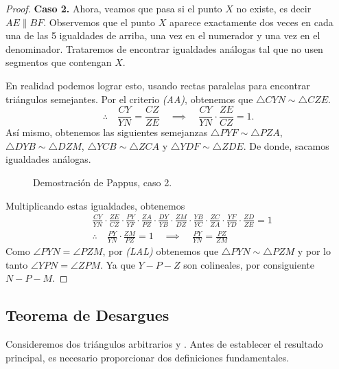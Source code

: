 \begin{proof}
    \textbf{Caso 2.}
    Ahora, veamos que pasa si el punto $X$ no existe, es decir $AE \parallel BF$.
    Observemos que el punto $X$ aparece exactamente dos veces en cada una de las 5 igualdades de arriba, una vez en el numerador y una vez en el denominador.
    Trataremos de encontrar igualdades análogas tal que no usen segmentos que contengan $X$.

    \begin{multicols}{2}
        En realidad podemos lograr esto, usando rectas paralelas para encontrar triángulos semejantes.
        Por el criterio \textit{(AA)}, obtenemos que $\triangle CYN \sim \triangle CZE$.
        \[
            \therefore  \quad \frac{CY}{YN} = \frac{CZ}{ZE} \quad \implies \quad \frac{CY}{YN} \cdot \frac{ZE}{CZ} = 1.
        \]
        Así mismo, obtenemos las siguientes semejanzas $\triangle PYF \sim \triangle PZA$, $\triangle DYB \sim \triangle DZM$, $\triangle YCB \sim \triangle ZCA$ y $\triangle YDF \sim \triangle ZDE$.
        De donde, sacamos igualdades análogas.
        \begin{figure}[H]
            \centering
            
            \caption{Demostración de Pappus, caso 2.}
        \end{figure}
    \end{multicols}

    Multiplicando estas igualdades, obtenemos
    \begin{align*}
        &\frac{CY}{YN} \cdot \frac{ZE}{CZ} \cdot \frac{PY}{YF} \cdot \frac{ZA}{PZ} \cdot \frac{DY}{YB} \cdot \frac{ZM}{DZ} \cdot \frac{YB}{YC} \cdot \frac{ZC}{ZA} \cdot \frac{YF}{YD} \cdot \frac{ZD}{ZE} = 1\\[3mm]
        &\therefore \quad \frac{PY}{YN} \cdot \frac{ZM}{PZ} = 1 \quad \implies \quad \frac{PY}{YN} = \frac{PZ}{ZM}
    \end{align*}
    Como $\angle PYN = \angle PZM$, por \textit{(LAL)} obtenemos que $\triangle PYN \sim \triangle PZM$ y por lo tanto $\angle YPN = \angle ZPM$.
    Ya que $Y - P - Z$ son colineales, por consiguiente $N - P - M$.
\end{proof}



\subsection{Teorema de Desargues}

Consideremos dos triángulos arbitrarios  y .
Antes de establecer el resultado principal, es necesario proporcionar dos definiciones fundamentales.

